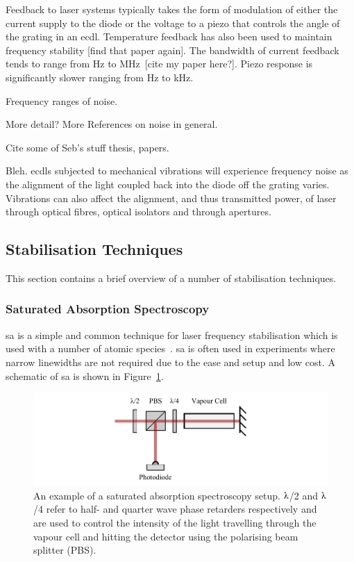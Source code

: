 Feedback to laser systems typically takes the form of modulation of either the current supply to the diode or the voltage to a piezo that controls the angle of the grating in an \gls{ecdl}.
Temperature feedback has also been used to maintain frequency stability {\color{red}[find that paper again]}.
The bandwidth of current feedback tends to range from \unit[0]{Hz} to MHz~\cite{ludlow_compact_2007}{\color{red}[cite my paper here?]}.
Piezo response is significantly slower ranging from \unit[0]{Hz} to \unit[100]{kHz}.

{\color{red}Frequency ranges of noise.}

{\color{red}More detail? More References on noise in general.}

{\color{red}Cite some of Seb's stuff thesis\cite{saliba_cold_2011}, papers\cite{saliba_linewidths_2009, saliba_mode_2009}.}

Bleh.
\Glspl{ecdl} subjected to mechanical vibrations will experience frequency noise as the alignment of the light coupled back into the diode off the grating varies.
Vibrations can also affect the alignment, and thus transmitted power, of laser through optical fibres, optical isolators and through apertures.

\subsection{Stabilisation Techniques}

This section contains a brief overview of a number of stabilisation techniques.

\subsubsection{Saturated Absorption Spectroscopy}
\Gls{sa} is a simple and common technique for laser frequency stabilisation which is used with a number of atomic species~\cite{demtroder_laser_2003}.
\Gls{sa} is often used in experiments where narrow linewidths are not required due to the ease and setup and low cost.
A schematic of \gls{sa} is shown in Figure~\ref{figure:satabs}.

\begin{figure}
\center
\includegraphics{part1/Figs/SatAbs.pdf}
\caption{An example of a saturated absorption spectroscopy setup. $\lambdaup$/2 and $\lambdaup$/4 refer to half- and quarter wave phase retarders respectively and are used to control the intensity of the light travelling through the vapour cell and hitting the detector using the polarising beam splitter (PBS).}
\label{figure:satabs}
\end{figure}


